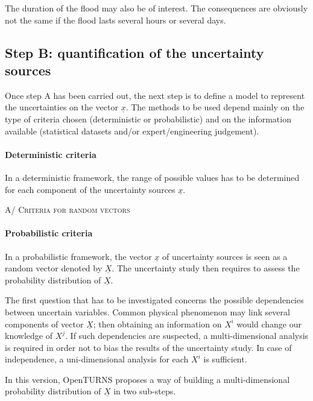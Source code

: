 The duration of the flood may also be of interest. The consequences are obviously not the same if the flood lasts several hours or several days.



\subsection{Step B: quantification of the  uncertainty sources}

Once step A has been carried out, the next step is to define a model to represent the uncertainties on the vector $\underline{x}$. The methods to be used depend mainly on the type of criteria chosen (deterministic or probabilistic) and on the information available (statistical datasets and/or expert/engineering judgement).


\paragraph{Deterministic criteria}
\par

In a deterministic framework, the range of possible values has to be determined for each component of the uncertainty sources $\underline{x}$.

{\textsc{A/ Criteria for random vectors}
}


\paragraph{Probabilistic criteria}
\par

In a probabilistic framework, the vector $\underline{x}$ of uncertainty sources is seen as a random vector denoted by $\underline{X}$. The uncertainty study then requires to assess the probability distribution of $\underline{X}$.

The first question that has to be investigated concerns the possible dependencies between uncertain variables. Common physical phenomenon may link several components of vector $\underline{X}$; then obtaining an information on $X^i$ would change our knowledge of $X^j$. If such dependencies are suspected, a multi-dimensional analysis is required in order not to bias the results of the uncertainty study. In case of independence, a uni-dimensional analysis for each $X^i$ is sufficient.

In this version, OpenTURNS proposes a way of building a multi-dimensional probability distribution of $\underline{X}$ in two sub-steps.

